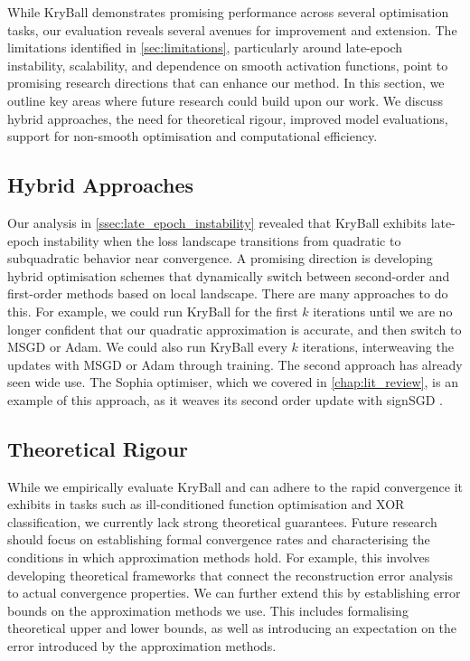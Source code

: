 While KryBall demonstrates promising performance across several optimisation tasks, our evaluation reveals several avenues for improvement and extension. The limitations identified in \cref{sec:limitations}, particularly around late-epoch instability, scalability, and dependence on smooth activation functions, point to promising research directions that can enhance our method. In this section, we outline key areas where future research could build upon our work. We discuss hybrid approaches, the need for theoretical rigour, improved model evaluations, support for non-smooth optimisation and computational efficiency.

\subsection{Hybrid Approaches}
\label{ssec:hybrid_approaches}

Our analysis in \cref{ssec:late_epoch_instability} revealed that KryBall exhibits late-epoch instability when the loss landscape transitions from quadratic to subquadratic behavior near convergence. A promising direction is developing hybrid optimisation schemes that dynamically switch between second-order and first-order methods based on local landscape. There are many approaches to do this. For example, we could run KryBall for the first $k$ iterations until we are no longer confident that our quadratic approximation is accurate, and then switch to MSGD or Adam. We could also run KryBall every $k$ iterations, interweaving the updates with MSGD or Adam through training. The second approach has already seen wide use. The Sophia optimiser, which we covered in \cref{chap:lit_review}, is an example of this approach, as it weaves its second order update with signSGD \citep{liu2023sophia}.

\subsection{Theoretical Rigour}
\label{sec:theoretical_rigour}

While we empirically evaluate KryBall and can adhere to the rapid convergence it exhibits in tasks such as ill-conditioned function optimisation and XOR classification, we currently lack strong theoretical guarantees. Future research should focus on establishing formal convergence rates and characterising the conditions in which approximation methods hold. For example, this involves developing theoretical frameworks that connect the reconstruction error analysis to actual convergence properties. We can further extend this by establishing error bounds on the approximation methods we use. This includes formalising theoretical upper and lower bounds, as well as introducing an expectation on the error introduced by the approximation methods. 

